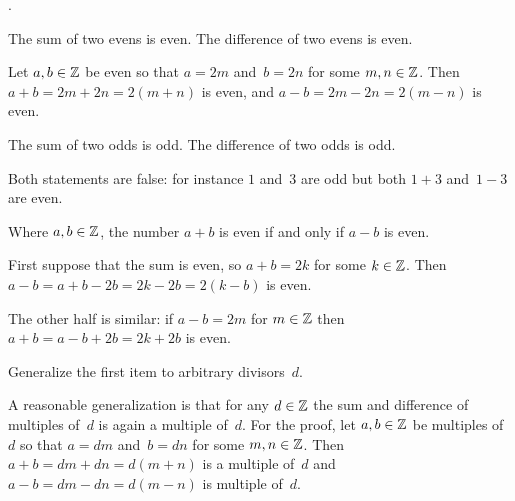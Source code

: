 \documentclass{ibl}  %
\begin{document}
\begin{problem} 
\pord.
\begin{exes}
\begin{exercise}
  The sum of two evens is even.
  The difference of two evens is even.  
\end{exercise}
\begin{answer}
  Let $a,b\in\mathbb{Z}$ be even so that $a=2m$ and~$b=2n$ for some $m,n\in\mathbb{Z}$.
  Then $a+b=2m+2n=2(m+n)$ is even, and $a-b=2m-2n=2(m-n)$ is even.  
\end{answer}

\begin{exercise}
  The sum of two odds is odd. 
  The difference of two odds is odd.  
\end{exercise}
\begin{answer}
  Both statements are false: for instance $1$ and~$3$ are odd
  but both $1+3$ and~$1-3$ are even.  
\end{answer}

\begin{exercise}
  Where $a,b\in\mathbb{Z}$, the number $a+b$ is even if and only if $a-b$ is even.
\end{exercise}
\begin{answer}
  First suppose that the sum is even, so $a+b=2k$ for some $k\in\mathbb{Z}$.
  Then $a-b=a+b-2b=2k-2b=2(k-b)$ is even.

  The other half is similar:
  if $a-b=2m$ for $m\in\mathbb{Z}$ then $a+b=a-b+2b=2k+2b$ is even.  
\end{answer}

\begin{exercise}
  Generalize the first item to arbitrary divisors~$d$.
\end{exercise}
\begin{answer}
  A reasonable generalization is that for any $d\in\mathbb{Z}$
  the sum and difference of multiples of~$d$ is again a multiple of~$d$. 
  For the proof,
  let $a,b\in\mathbb{Z}$ be multiples of~$d$ so that $a=dm$ and~$b=dn$ 
  for some $m,n\in\mathbb{Z}$.
  Then $a+b=dm+dn=d(m+n)$ is a multiple of~$d$
  and $a-b=dm-dn=d(m-n)$ is multiple of~$d$.    
\end{answer}
\end{exes}
\end{problem}
\end{document}
